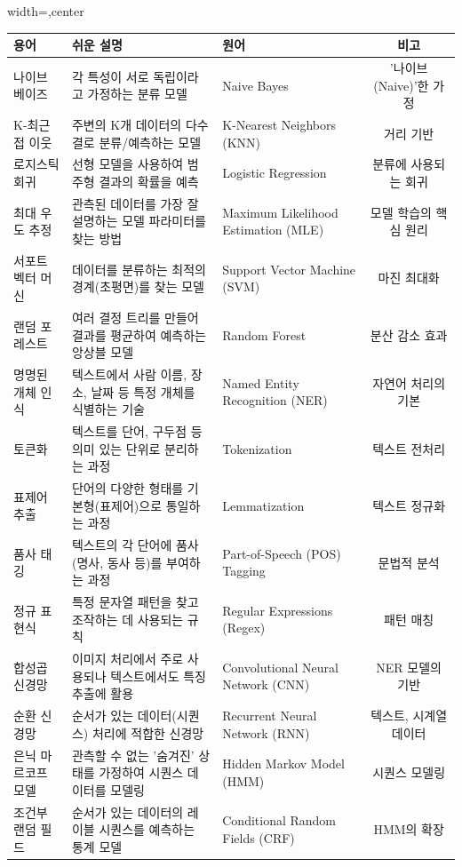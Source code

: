 \documentclass[11pt,a4paper]{article}
\theoremstyle{definition}
\begin{document}
\begin{adjustbox}{width=\textwidth,center}
\begin{tabular}{lllc}
\toprule
\textbf{용어} & \textbf{쉬운 설명} & \textbf{원어} & \textbf{비고} \\
\midrule
나이브 베이즈 & 각 특성이 서로 독립이라고 가정하는 분류 모델 & Naive Bayes & '나이브(Naive)'한 가정 \\
K-최근접 이웃 & 주변의 K개 데이터의 다수결로 분류/예측하는 모델 & K-Nearest Neighbors (KNN) & 거리 기반 \\
로지스틱 회귀 & 선형 모델을 사용하여 범주형 결과의 확률을 예측 & Logistic Regression & 분류에 사용되는 회귀 \\
최대 우도 추정 & 관측된 데이터를 가장 잘 설명하는 모델 파라미터를 찾는 방법 & Maximum Likelihood Estimation (MLE) & 모델 학습의 핵심 원리 \\
서포트 벡터 머신 & 데이터를 분류하는 최적의 경계(초평면)를 찾는 모델 & Support Vector Machine (SVM) & 마진 최대화 \\
랜덤 포레스트 & 여러 결정 트리를 만들어 결과를 평균하여 예측하는 앙상블 모델 & Random Forest & 분산 감소 효과 \\
명명된 개체 인식 & 텍스트에서 사람 이름, 장소, 날짜 등 특정 개체를 식별하는 기술 & Named Entity Recognition (NER) & 자연어 처리의 기본 \\
토큰화 & 텍스트를 단어, 구두점 등 의미 있는 단위로 분리하는 과정 & Tokenization & 텍스트 전처리 \\
표제어 추출 & 단어의 다양한 형태를 기본형(표제어)으로 통일하는 과정 & Lemmatization & 텍스트 정규화 \\
품사 태깅 & 텍스트의 각 단어에 품사(명사, 동사 등)를 부여하는 과정 & Part-of-Speech (POS) Tagging & 문법적 분석 \\
정규 표현식 & 특정 문자열 패턴을 찾고 조작하는 데 사용되는 규칙 & Regular Expressions (Regex) & 패턴 매칭 \\
합성곱 신경망 & 이미지 처리에서 주로 사용되나 텍스트에서도 특징 추출에 활용 & Convolutional Neural Network (CNN) & NER 모델의 기반 \\
순환 신경망 & 순서가 있는 데이터(시퀀스) 처리에 적합한 신경망 & Recurrent Neural Network (RNN) & 텍스트, 시계열 데이터 \\
은닉 마르코프 모델 & 관측할 수 없는 '숨겨진' 상태를 가정하여 시퀀스 데이터를 모델링 & Hidden Markov Model (HMM) & 시퀀스 모델링 \\
조건부 랜덤 필드 & 순서가 있는 데이터의 레이블 시퀀스를 예측하는 통계 모델 & Conditional Random Fields (CRF) & HMM의 확장 \\

\end{tabular}
\end{adjustbox}
\end{document}
